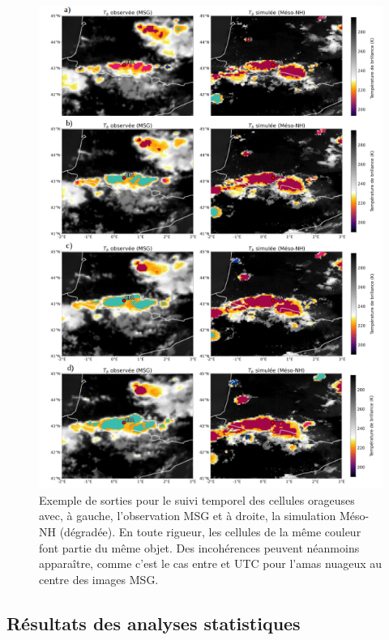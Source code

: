 \documentclass[12pt]{article}
\begin{document}
\vspace{-0.7cm}

\begin{figure}[H]
    \centering
    \includegraphics[width=0.9\linewidth]{Figures/suivi_temporel.png}
    \caption{Exemple de sorties pour le suivi temporel des cellules orageuses avec, à gauche, l'observation MSG et à droite, la simulation Méso-NH (dégradée). En toute rigueur, les cellules de la même couleur font partie du même objet. Des incohérences peuvent néanmoins apparaître, comme c’est le cas entre \protect{} et \protect{} UTC pour l'amas nuageux au centre des images MSG.}
    \label{fig:suivi_temporel}
\end{figure}

\newpage

\subsection{Résultats des analyses statistiques}
\label{Annexes:Analyse_stat}
\end{document}
